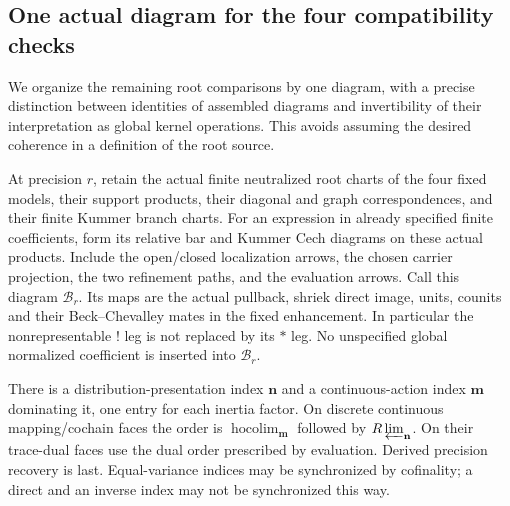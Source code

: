 \documentclass[11pt]{article}
\theoremstyle{definition}
\theoremstyle{remark}
\begin{document}
\subsection{One actual diagram for the four compatibility checks}
\label{sec:root-common-diagram}
We organize the remaining root comparisons by one diagram, with a
precise distinction between identities of assembled diagrams and
invertibility of their interpretation as global kernel operations.
This avoids assuming the desired coherence in a definition of the
root source.

At precision $r$, retain the actual finite neutralized root charts
of the four fixed models, their support products, their diagonal
and graph correspondences, and their finite Kummer branch charts.
For an expression in already specified finite coefficients, form
its relative bar and Kummer Cech diagrams on these actual products.
Include the open/closed localization arrows, the chosen carrier
projection, the two refinement paths, and the evaluation arrows.
Call this diagram $\mathcal B_r$.  Its maps are the actual pullback,
shriek direct image, units, counits and their Beck--Chevalley mates
in the fixed enhancement.  In particular the nonrepresentable
$!$ leg is not replaced by its $*$ leg.  No unspecified global
normalized coefficient is inserted into $\mathcal B_r$.

There is a distribution-presentation index $\mathbf n$ and a
continuous-action index $\mathbf m$ dominating it, one entry for
each inertia factor.  On discrete continuous mapping/cochain faces
the order is $\operatorname*{hocolim}_{\mathbf m}$ followed by
$R\varprojlim_{\mathbf n}$.  On their trace-dual faces use the dual
order prescribed by evaluation.  Derived precision recovery is
last.  Equal-variance indices may be synchronized by cofinality;
a direct and an inverse index may not be synchronized this way.
\end{document}
